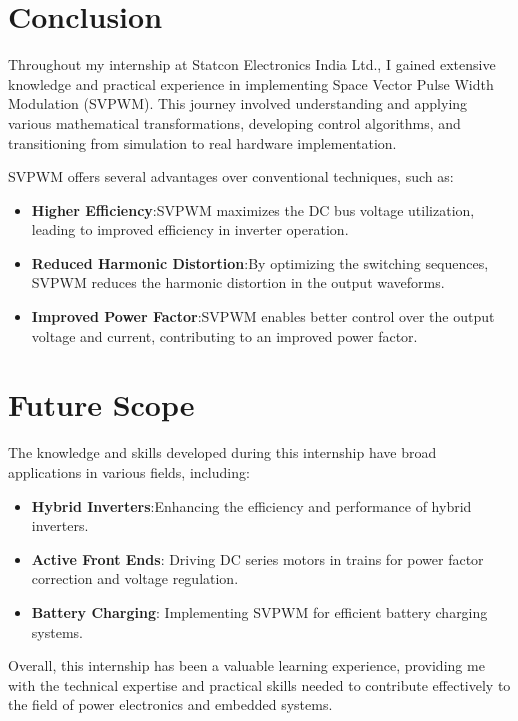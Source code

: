 \section{Conclusion}
Throughout my internship at Statcon Electronics India Ltd., I gained extensive
knowledge and practical experience in implementing Space Vector Pulse Width
Modulation (SVPWM). This journey involved understanding and applying various
mathematical transformations, developing control algorithms, and transitioning
from simulation to real hardware implementation.

\noindent
SVPWM offers several advantages over conventional techniques, such as:
\begin{itemize}
    \item \textbf{Higher Efficiency}:SVPWM maximizes the DC bus voltage utilization, leading to improved efficiency in inverter operation.
    \item \textbf{Reduced Harmonic Distortion}:By optimizing the switching sequences, SVPWM reduces the harmonic distortion in the output waveforms.
    \item \textbf{Improved Power Factor}:SVPWM enables better control over the output voltage and current, contributing to an improved power factor.
\end{itemize}

\section{Future Scope}
The knowledge and skills developed during this internship have broad
applications in various fields, including:

\begin{itemize}
    \item \textbf{Hybrid Inverters}:Enhancing the efficiency and performance of hybrid inverters.
    \item \textbf{Active Front Ends}: Driving DC series motors in trains for power factor correction and voltage regulation.
    \item \textbf{Battery Charging}: Implementing SVPWM for efficient battery charging systems.
\end{itemize}

Overall, this internship has been a valuable learning experience, providing me
with the technical expertise and practical skills needed to contribute
effectively to the field of power electronics and embedded systems.